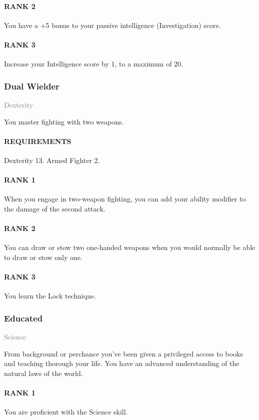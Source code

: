 \paragraph{RANK 2} You have a +5 bonus to your passive intelligence (Investigation) score.
\paragraph{RANK 3} Increase your Intelligence score by 1, to a maximum of 20.

\subsubsection{Dual Wielder} \label{tal::dualwielder}
\small{\textcolor{gray}{Dexterity}}

\normalsize
You master fighting with two weapons.
\paragraph{REQUIREMENTS} Dexterity 13. Armed Fighter 2.
\paragraph{RANK 1} When you engage in two-weapon fighting, you can add your ability modifier to the damage of the second attack.
\paragraph{RANK 2} You can draw or stow two one-handed weapons when you would normally be able to draw or stow only one.
\paragraph{RANK 3} You learn the Lock technique.

\subsubsection{Educated} \label{tal::educated}
\small{\textcolor{gray}{Science}}

\normalsize
From background or perchance you've been given a privileged access to books and teaching thorough your life.
You have an advanced understanding of the natural laws of the world.
\paragraph{RANK 1} You are proficient with the Science skill.
